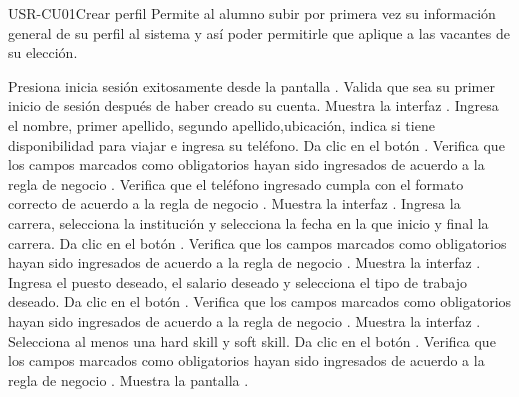 \begin{UseCase}[]{USR-CU01}{Crear perfil}{
	Permite al alumno subir por primera vez su información general de su perfil al sistema y así 
	poder permitirle que aplique a las vacantes de su elección.
}
\end{UseCase}

\begin{UCtrayectoria}
	\UCpaso [\UCactor] Presiona inicia sesión exitosamente desde la pantalla .
    \UCpaso [\UCsist] Valida que sea su primer inicio de sesión después de haber creado su cuenta.
	\UCpaso [\UCsist] Muestra la interfaz .
	\UCpaso [\UCactor] Ingresa el nombre, primer apellido, segundo apellido,ubicación, 
	indica si tiene disponibilidad para viajar e ingresa su teléfono.\label{USRCU01-grl1}
	\UCpaso [\UCactor] Da clic en el botón .
	\UCpaso [\UCsist] Verifica que los campos marcados como obligatorios hayan sido ingresados de acuerdo a la
	regla de negocio .
	\UCpaso [\UCsist] Verifica que el teléfono ingresado cumpla con el formato correcto de acuerdo a la regla de negocio  .  
	\UCpaso [\UCsist] Muestra la interfaz .
	\UCpaso [\UCactor] Ingresa la carrera, selecciona la institución y selecciona
	la fecha en la que inicio y final la carrera.
	\UCpaso [\UCactor] Da clic en el botón .
	\UCpaso [\UCsist] Verifica que los campos marcados como obligatorios hayan sido ingresados de acuerdo a la
	regla de negocio .\label{USRCU01-grl2} 
	\UCpaso [\UCsist] Muestra la interfaz .
	\UCpaso [\UCactor] Ingresa el  puesto deseado, el salario deseado y selecciona
	el  tipo de trabajo deseado.
	\UCpaso [\UCactor] Da clic en el botón .
	\UCpaso [\UCsist] Verifica que los campos marcados como obligatorios hayan sido ingresados de acuerdo a la
	regla de negocio .\label{USRCU01-grl3} 
	\UCpaso [\UCsist] Muestra la interfaz .
	\UCpaso [\UCactor] Selecciona al menos una hard skill y soft skill.
	\UCpaso [\UCactor] Da clic en el botón .
	\UCpaso [\UCsist] Verifica que los campos marcados como obligatorios hayan sido ingresados de acuerdo a la
	regla de negocio .\label{USRCU01-grl4} 
	\UCpaso [\UCsist] Muestra la pantalla . %
\end{UCtrayectoria}

